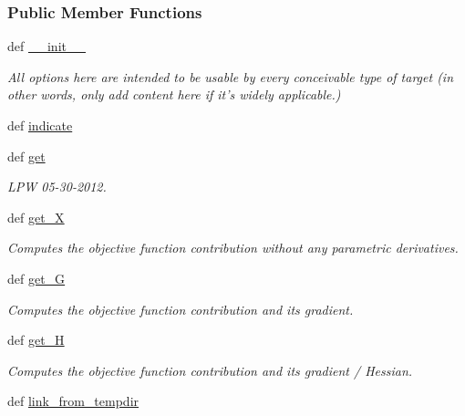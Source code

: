 \subsubsection*{\-Public \-Member \-Functions}
\begin{DoxyCompactItemize}
\item 
def \hyperlink{classforcebalance_1_1leastsq_1_1LeastSquares_a761c0f4121b06e2a74b5fa548a88e400}{\-\_\-\-\_\-init\-\_\-\-\_\-}
\begin{DoxyCompactList}\small\item\em \-All options here are intended to be usable by every conceivable type of target (in other words, only add content here if it's widely applicable.) \end{DoxyCompactList}\item 
def \hyperlink{classforcebalance_1_1leastsq_1_1LeastSquares_ac8e203986ec7507b627a4545d24239d5}{indicate}
\item 
def \hyperlink{classforcebalance_1_1leastsq_1_1LeastSquares_a2010f34730d88209b738d557cca09a1c}{get}
\begin{DoxyCompactList}\small\item\em \-L\-P\-W 05-\/30-\/2012. \end{DoxyCompactList}\item 
def \hyperlink{classforcebalance_1_1target_1_1Target_a606dd136f195c267c05a2455405e5949}{get\-\_\-\-X}
\begin{DoxyCompactList}\small\item\em \-Computes the objective function contribution without any parametric derivatives. \end{DoxyCompactList}\item 
def \hyperlink{classforcebalance_1_1target_1_1Target_afa8cc38c8bba8861c072e789717aa049}{get\-\_\-\-G}
\begin{DoxyCompactList}\small\item\em \-Computes the objective function contribution and its gradient. \end{DoxyCompactList}\item 
def \hyperlink{classforcebalance_1_1target_1_1Target_a1d2ee27fe86a09769c1816af23b09adb}{get\-\_\-\-H}
\begin{DoxyCompactList}\small\item\em \-Computes the objective function contribution and its gradient / \-Hessian. \end{DoxyCompactList}\item 
def \hyperlink{classforcebalance_1_1target_1_1Target_a5aa4958cea0a48138511567a076c5a82}{link\-\_\-from\-\_\-tempdir}

\end{DoxyCompactItemize}
